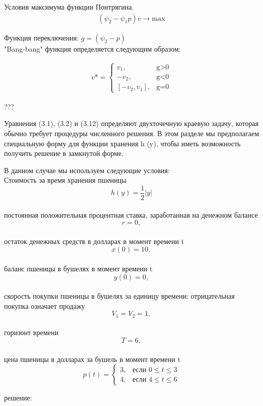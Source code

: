Условия максимума функции Понтрягина.
\begin{align}
    (\psi_{2} - \psi_{1} p)v\to \mathrm{max}
\end{align} 

Функция переключения:
$g = (\psi_{2} - p)$\\

"Bang-bang" функция определяется следующим образом:

\begin{align}
v* = 
 \begin{cases}
   v_{1}, &\text{g>0}\\
   -v_{2}, &\text{g<0}\\
   [-v_{2},v_{1}], &\text{g=0}
 \end{cases}
\end{align}


???

Уравнения (3.1), (3.2) и (3.12) определяют двухточечную краевую задачу, которая обычно требует процедуры численного решения. В этом разделе мы предполагаем специальную форму для функции хранения h (y), чтобы иметь возможность получить решение в замкнутой форме.

В данном случае мы используем следующие условия:\\
 Стоимость за время хранения пшеницы $$ h(y) = \frac{1}{2}|y|$$\\
постоянная положительная процентная ставка, заработанная на денежном балансе $$ r = 0, $$\\
остаток денежных средств в долларах в момент времени t $$ x(0) = 10, $$\\
баланс пшеницы в бушелях в момент времени t $$ y(0) = 0, $$\\
скорость покупки пшеницы в бушелях за единицу времени; отрицательная покупка означает продажу $$ V_{1} = V_{2} = 1, $$\\
горизонт времени $$ T = 6, $$\\
цена пшеницы в долларах за бушель в момент времени t
\begin{displaymath}
p(t) =\left\{ \begin{array}{ll}
 3, & \textrm{если $0 \le t\le 3$}\\
 4, & \textrm{если $4  \le t  \le 6$}
  \end{array} \right.
\end{displaymath}


решение:\\

